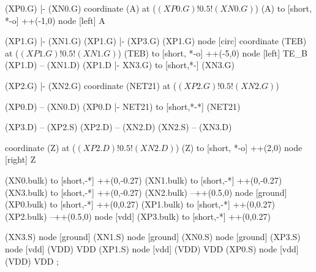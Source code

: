 \begin{circuitikz}[american]
			
	(XP0.G)	|- (XN0.G)
	coordinate (A) at ($(XP0.G)!0.5!(XN0.G)$)
	(A) to [short, *-o] ++(-1,0) node [left] {A}
	
	(XP1.G) |- (XN1.G)
	(XP1.G) |- (XP3.G)
	(XP1.G) node [circ]{}
	coordinate (TEB) at ($(XP1.G)!0.5!(XN1.G)$)
	(TEB) to [short, *-o] ++(-5,0) node [left] {TE\_B}
	(XP1.D) -- (XN1.D)
	(XP1.D |- XN3.G) to [short,*-] (XN3.G)
	
	(XP2.G) |- (XN2.G)
	coordinate (NET21) at ($(XP2.G)!0.5!(XN2.G)$)
	
	(XP0.D) -- (XN0.D)
	(XP0.D |- NET21) to [short,*-*] (NET21)
	
	(XP3.D) -- (XP2.S)
	(XP2.D) -- (XN2.D)
	(XN2.S) -- (XN3.D)
	
	coordinate (Z) at ($(XP2.D)!0.5!(XN2.D)$)
	(Z) to [short, *-o] ++(2,0) node [right] {Z}
	
	(XN0.bulk) to [short,-*] ++(0,-0.27)	
	(XN1.bulk) to [short,-*] ++(0,-0.27)
	(XN3.bulk) to [short,-*] ++(0,-0.27)
	(XN2.bulk) --++(0.5,0) node [ground]{}	
	(XP0.bulk) to [short,-*] ++(0,0.27)	
	(XP1.bulk) to [short,-*] ++(0,0.27)		
	(XP2.bulk) --++(0.5,0) node [vdd]{}
	(XP3.bulk) to [short,-*] ++(0,0.27)		


	(XN3.S) node [ground] {}
	(XN1.S) node [ground] {}
	(XN0.S) node [ground] {}
	(XP3.S) node [vdd] (VDD) {VDD}
	(XP1.S) node [vdd] (VDD) {VDD}
	(XP0.S) node [vdd] (VDD) {VDD}
;

\end{circuitikz}

